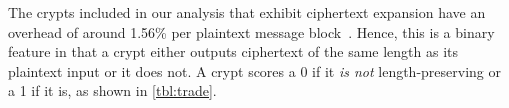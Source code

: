 The crypts included in our analysis that exhibit ciphertext expansion have an
overhead of around 1.56\% per plaintext message block~\cite{Freestyle}. Hence,
this is a binary feature in that a crypt either outputs ciphertext of the same
length as its plaintext input or it does not. A crypt scores a 0 if it {\em is
not} length-preserving or a 1 if it is, as shown in \cref{tbl:trade}.
